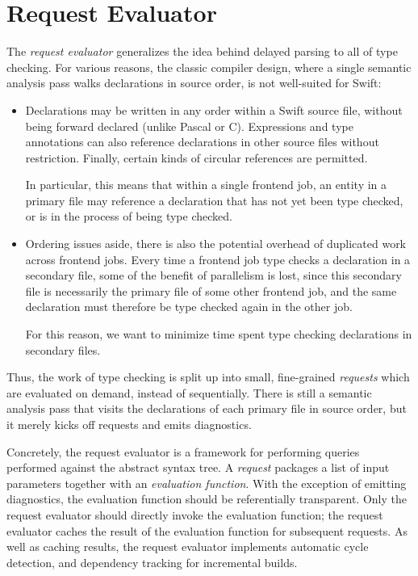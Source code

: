 \documentclass[../generics]{subfiles}
\begin{document}
\section{Request Evaluator}\label{request evaluator}

The \emph{request evaluator} generalizes the idea behind delayed parsing to all of type checking. For various reasons, the classic compiler design, where a single semantic analysis pass walks declarations in source order, is not well-suited for Swift:
\begin{itemize}
\item Declarations may be written in any order within a Swift source file, without being forward declared (unlike Pascal or C). Expressions and type annotations can also reference declarations in other source files without restriction. Finally, certain kinds of circular references are permitted.

In particular, this means that within a single frontend job, an entity in a primary file may reference a declaration that has not yet been type checked, or is in the process of being type checked.

\item Ordering issues aside, there is also the potential overhead of duplicated work across frontend jobs. Every time a frontend job type checks a declaration in a secondary file, some of the benefit of parallelism is lost, since this secondary file is necessarily the primary file of some other frontend job, and the same declaration must therefore be type checked again in the other job.

For this reason, we want to minimize time spent type checking declarations in secondary files.
\end{itemize}

Thus, the work of type checking is split up into small, fine-grained \emph{requests} which are evaluated on demand, instead of sequentially. There is still a semantic analysis pass that visits the declarations of each primary file in source order, but it merely kicks off requests and emits diagnostics.

Concretely, the request evaluator is a framework for performing queries performed against the abstract syntax tree. A \emph{request} packages a list of input parameters together with an \emph{evaluation function}. With the exception of emitting diagnostics, the evaluation function should be referentially transparent. Only the request evaluator should directly invoke the evaluation function; the request evaluator caches the result of the evaluation function for subsequent requests. As well as caching results, the request evaluator implements automatic cycle detection, and dependency tracking for incremental builds.
\end{document}
